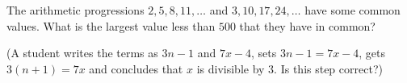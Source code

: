 The arithmetic progressions $2,5,8,11,\dots$ and $3,10,17,24,\dots$ have some common values. What is the largest value less than $500$ that they have in common?

(A student writes the terms as $3n-1$ and $7x-4$, sets $3n-1=7x-4$, gets $3(n+1)=7x$ and concludes that $x$ is divisible by $3$. Is this step correct?)
